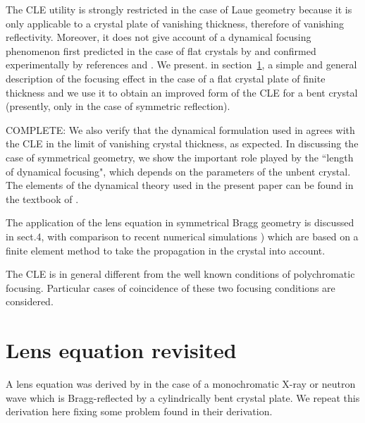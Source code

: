 \documentclass{iucr}              %
\newcommand{\inblue}[1]{{\color{blue}#1}}
\begin{document}
The CLE utility is strongly restricted in the case of Laue geometry because it is only applicable to a crystal plate of vanishing thickness, therefore of vanishing reflectivity. Moreover, it does not give account of a dynamical focusing phenomenon first  predicted in the case of flat crystals by \cite{AfanasevKohn1977} and confirmed experimentally by references \cite{Aristov1978} and \cite{Aristov1980} . We present. in section~\ref{sec:CLE}, a simple and general description of the focusing effect in the case of a flat crystal plate of finite thickness and we use it to obtain an improved form of the CLE for a bent crystal (presently, only in the case of symmetric reflection). 
\inblue{COMPLETE: We also verify that the dynamical formulation used in \cite{GuigayFerrero2016} agrees with the CLE in the limit of vanishing crystal thickness, as expected. In discussing the case of symmetrical geometry, we show the important role played by the ``length of dynamical focusing",  which depends on the parameters of the unbent crystal. The elements of the dynamical theory used in the present paper can be found in the textbook of \cite{authierbook}.

The application of the lens equation in symmetrical Bragg geometry is discussed in sect.4, with comparison to recent numerical simulations \cite{Honkanen2018}) which are based on a finite element method to take the propagation in the crystal into account.

The CLE is in general different from the well known conditions of polychromatic focusing. Particular cases of coincidence of these two focusing conditions are considered.   
}

\section{Lens equation revisited}
\label{sec:CLE}

A lens equation was derived by \cite{CK} in the case of a monochromatic X-ray or neutron wave which is Bragg-reflected by a cylindrically bent crystal plate. We repeat this derivation here fixing some problem found in their derivation. 
\end{document}
